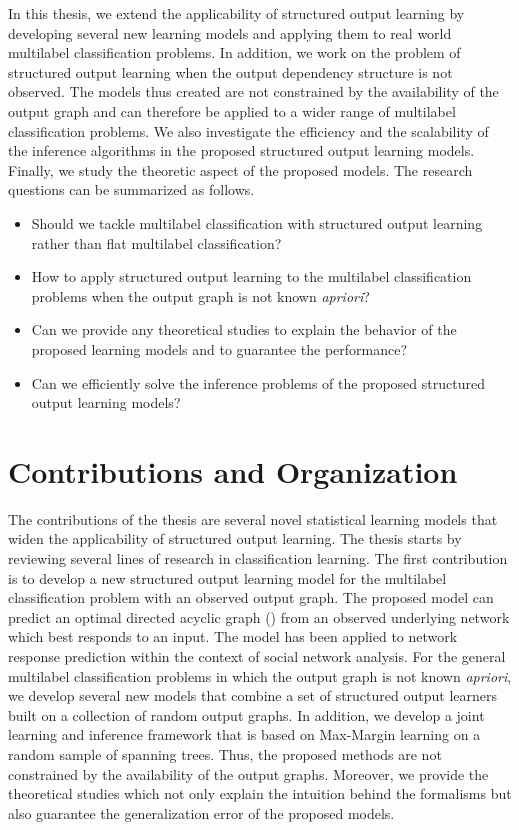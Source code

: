 In this thesis, we extend the applicability of structured output learning by developing several new learning models and applying them to real world multilabel classification problems.
In addition, we work on the problem of structured output learning when the output dependency structure is not observed.
The models thus created are not constrained by the availability of the output graph and can therefore be applied to a wider range of multilabel classification problems.
We also investigate the efficiency and the scalability of the inference algorithms in the proposed structured output learning models.
Finally, we study the theoretic aspect of the proposed models.
The research questions can be summarized as follows.
\begin{itemize}
\item Should we tackle multilabel classification with structured output learning rather than flat multilabel classification?
\item How to apply structured output learning to the multilabel classification problems when the output graph is not known \textit{apriori}?
\item Can we provide any theoretical studies to explain the behavior of the proposed learning models and to guarantee the performance?
\item Can we efficiently solve the inference problems of the proposed structured output learning models?
\end{itemize}



%
%
\section{Contributions and Organization}

The contributions of the thesis are several novel statistical learning models that widen the applicability of structured output learning.
The thesis starts by reviewing several lines of research in classification learning.
The first contribution is to develop a new structured output learning model for the multilabel classification problem with an observed output graph.
The proposed model can predict an optimal directed acyclic graph (\daggraph) from an observed underlying network which best responds to an input.
The model has been applied to network response prediction within the context of social network analysis.
For the general multilabel classification problems in which the output graph is not known \textit{apriori}, we develop several new models that combine a set of structured output learners built on a collection of random output graphs.
In addition, we develop a joint learning and inference framework that is based on Max-Margin learning on a random sample of spanning trees.
Thus, the proposed methods are not constrained by the availability of the output graphs.
Moreover, we provide the theoretical studies which not only explain the intuition behind the formalisms but also guarantee the generalization error of the proposed models.

